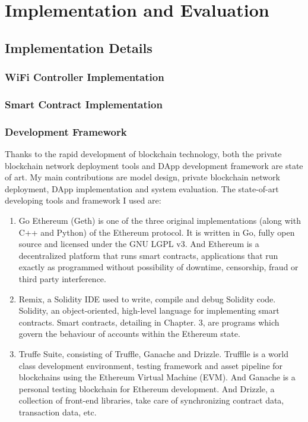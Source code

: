 \chapter{Implementation and Evaluation}
\label{chp:chap-five}

\section{Implementation Details}

\subsection{WiFi Controller Implementation}



\subsection{Smart Contract Implementation}



\subsection{Development Framework}

Thanks to the rapid development of blockchain technology, both the private blockchain network deployment tools and DApp\cite{johnston_general_nodate} development framework are state of art. My main contributions are model design, private blockchain network deployment, DApp implementation and system evaluation. The state-of-art developing tools and framework I used are:
\begin{enumerate}
\item Go Ethereum (Geth) is one of the three original implementations (along with C++ and Python) of the Ethereum protocol. It is written in Go, fully open source and licensed under the GNU LGPL v3. And Ethereum is a decentralized platform that runs smart contracts, applications that run exactly as programmed without possibility of downtime, censorship, fraud or third party interference. 
\item Remix, a Solidity IDE used to write, compile and debug Solidity code. Solidity, an object-oriented, high-level language for implementing smart contracts. Smart contracts, detailing in Chapter. 3, are programs which govern the behaviour of accounts within the Ethereum state. 
\item Truffe Suite, consisting of Truffle, Ganache and Drizzle. Trufflle is a world class development environment, testing framework and asset pipeline for blockchains using the Ethereum Virtual Machine (EVM). And Ganache is a personal testing blockchain for Ethereum development. And Drizzle, a collection of front-end libraries, take care of synchronizing contract data, transaction data, etc. 
\end{enumerate}

